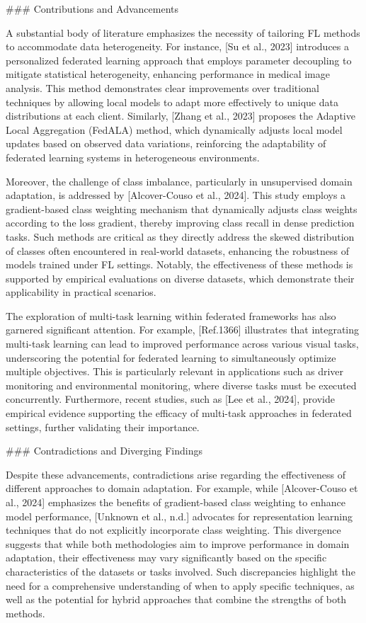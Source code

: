 \documentclass[journal]{IEEEtran}
\begin{document}
\#\#\# Contributions and Advancements

A substantial body of literature emphasizes the necessity of tailoring FL methods to accommodate data heterogeneity. For instance, [Su et al., 2023] introduces a personalized federated learning approach that employs parameter decoupling to mitigate statistical heterogeneity, enhancing performance in medical image analysis. This method demonstrates clear improvements over traditional techniques by allowing local models to adapt more effectively to unique data distributions at each client. Similarly, [Zhang et al., 2023] proposes the Adaptive Local Aggregation (FedALA) method, which dynamically adjusts local model updates based on observed data variations, reinforcing the adaptability of federated learning systems in heterogeneous environments.

Moreover, the challenge of class imbalance, particularly in unsupervised domain adaptation, is addressed by [Alcover-Couso et al., 2024]. This study employs a gradient-based class weighting mechanism that dynamically adjusts class weights according to the loss gradient, thereby improving class recall in dense prediction tasks. Such methods are critical as they directly address the skewed distribution of classes often encountered in real-world datasets, enhancing the robustness of models trained under FL settings. Notably, the effectiveness of these methods is supported by empirical evaluations on diverse datasets, which demonstrate their applicability in practical scenarios.

The exploration of multi-task learning within federated frameworks has also garnered significant attention. For example, [Ref.1366] illustrates that integrating multi-task learning can lead to improved performance across various visual tasks, underscoring the potential for federated learning to simultaneously optimize multiple objectives. This is particularly relevant in applications such as driver monitoring and environmental monitoring, where diverse tasks must be executed concurrently. Furthermore, recent studies, such as [Lee et al., 2024], provide empirical evidence supporting the efficacy of multi-task approaches in federated settings, further validating their importance.

\#\#\# Contradictions and Diverging Findings

Despite these advancements, contradictions arise regarding the effectiveness of different approaches to domain adaptation. For example, while [Alcover-Couso et al., 2024] emphasizes the benefits of gradient-based class weighting to enhance model performance, [Unknown et al., n.d.] advocates for representation learning techniques that do not explicitly incorporate class weighting. This divergence suggests that while both methodologies aim to improve performance in domain adaptation, their effectiveness may vary significantly based on the specific characteristics of the datasets or tasks involved. Such discrepancies highlight the need for a comprehensive understanding of when to apply specific techniques, as well as the potential for hybrid approaches that combine the strengths of both methods.
\end{document}
